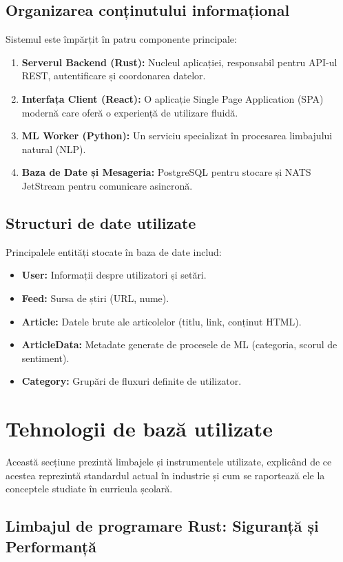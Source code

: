 \documentclass[12pt,a4paper]{article}
\begin{document}
\subsection{Organizarea conținutului informațional}
Sistemul este împărțit în patru componente principale:
\begin{enumerate}
    \item \textbf{Serverul Backend (Rust):} Nucleul aplicației, responsabil pentru API-ul REST, autentificare și coordonarea datelor.
    \item \textbf{Interfața Client (React):} O aplicație Single Page Application (SPA) modernă care oferă o experiență de utilizare fluidă.
    \item \textbf{ML Worker (Python):} Un serviciu specializat în procesarea limbajului natural (NLP).
    \item \textbf{Baza de Date și Mesageria:} PostgreSQL pentru stocare și NATS JetStream pentru comunicare asincronă.
\end{enumerate}

\subsection{Structuri de date utilizate}
Principalele entități stocate în baza de date includ:
\begin{itemize}
    \item \textbf{User:} Informații despre utilizatori și setări.
    \item \textbf{Feed:} Sursa de știri (URL, nume).
    \item \textbf{Article:} Datele brute ale articolelor (titlu, link, conținut HTML).
    \item \textbf{ArticleData:} Metadate generate de procesele de ML (categoria, scorul de sentiment).
    \item \textbf{Category:} Grupări de fluxuri definite de utilizator.
\end{itemize}

\newpage

\section{Tehnologii de bază utilizate}

Această secțiune prezintă limbajele și instrumentele utilizate, explicând de ce acestea reprezintă standardul actual în industrie și cum se raportează ele la conceptele studiate în curricula școlară.

\subsection{Limbajul de programare Rust: Siguranță și Performanță}
\end{document}
